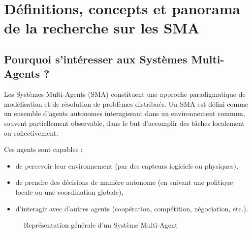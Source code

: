 \documentclass[ twoside,openright,titlepage,numbers=noenddot,headinclude,%
                footinclude=true,cleardoublepage=empty,abstractoff, %
                BCOR=5mm,paper=a4,fontsize=11pt,%
                french,american,%
                ]{scrreprt}
\begin{document}
\section{Définitions, concepts et panorama de la recherche sur les SMA}\label{sec:sma-concepts}


\subsection*{Pourquoi s'intéresser aux Systèmes Multi-Agents ?}

Les Systèmes Multi-Agents (SMA) constituent une approche paradigmatique de modélisation et de résolution de problèmes distribués. Un SMA est défini comme un ensemble d'agents autonomes interagissant dans un environnement commun, souvent partiellement observable, dans le but d'accomplir des tâches localement ou collectivement.

Ces agents sont capables :
\begin{itemize}
    \item de percevoir leur environnement (par des capteurs logiciels ou physiques),
    \item de prendre des décisions de manière autonome (en suivant une politique locale ou une coordination globale),
    \item d'interagir avec d'autres agents (coopération, compétition, négociation, etc.).
\end{itemize}

\begin{figure}[H]
    \centering
    \caption{Représentation générale d'un Système Multi-Agent}
    \label{fig:sma-schema}
\end{figure}
\end{document}
